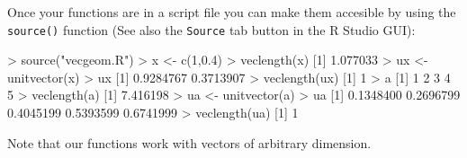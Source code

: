 Once your functions are in a script file you can make them accesible by
using the \lstinline!source()! function (See also the
\lstinline!Source! tab button in the R Studio GUI):
%
\begin{R}
> source("vecgeom.R")
> x <- c(1,0.4)
> veclength(x)
[1] 1.077033
> ux <- unitvector(x)
> ux
[1] 0.9284767 0.3713907
> veclength(ux)
[1] 1
> a
[1] 1 2 3 4 5
> veclength(a)
[1] 7.416198
> ua <- unitvector(a)
> ua
[1] 0.1348400 0.2696799 0.4045199 0.5393599 0.6741999
> veclength(ua)
[1] 1
\end{R}
Note that our functions work with vectors of arbitrary dimension.




